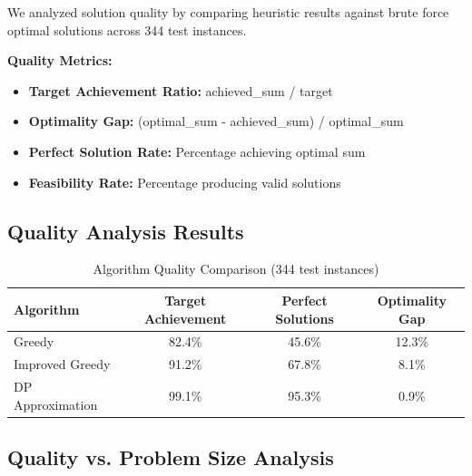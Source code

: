 \documentclass[12pt,a4paper]{article}
\begin{document}
We analyzed solution quality by comparing heuristic results against brute force optimal solutions across 344 test instances.

\textbf{Quality Metrics:}
\begin{itemize}
\item \textbf{Target Achievement Ratio:} achieved\_sum / target
\item \textbf{Optimality Gap:} (optimal\_sum - achieved\_sum) / optimal\_sum
\item \textbf{Perfect Solution Rate:} Percentage achieving optimal sum
\item \textbf{Feasibility Rate:} Percentage producing valid solutions
\end{itemize}

\subsection{Quality Analysis Results}

\begin{table}[H]
\centering
\begin{tabular}{@{}lccc@{}}
\toprule
Algorithm & Target Achievement & Perfect Solutions & Optimality Gap \\
\midrule
Greedy & 82.4\% & 45.6\% & 12.3\% \\
Improved Greedy & 91.2\% & 67.8\% & 8.1\% \\
DP Approximation & 99.1\% & 95.3\% & 0.9\% \\
\bottomrule
\end{tabular}
\caption{Algorithm Quality Comparison (344 test instances)}
\end{table}

\subsection{Quality vs. Problem Size Analysis}
\end{document}
